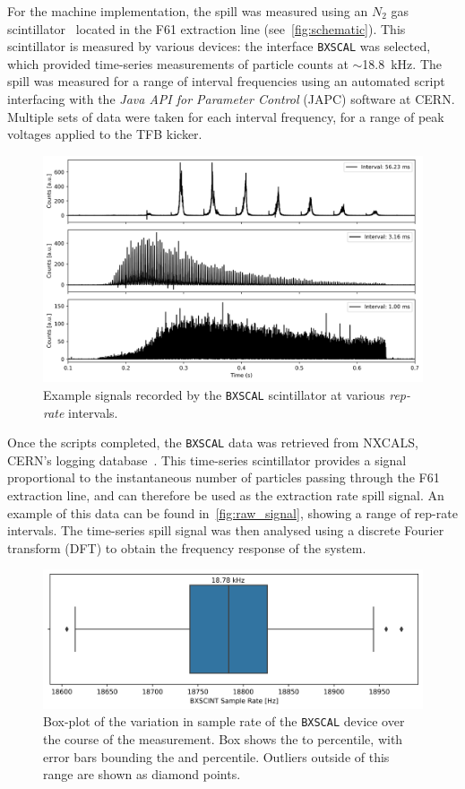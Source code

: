 \documentclass[11pt]{report}
\begin{document}
For the machine implementation, the spill was measured using an $N_2$ gas scintillator~\cite{Actis:bxscint} located in the F61 extraction line (see~\autoref{fig:schematic}). This scintillator is measured by various devices: the interface \verb|BXSCAL| was selected, which provided time-series measurements of particle counts at $\sim$\qty{18.8}{\kilo\hertz}. The spill was measured for a range of interval frequencies using an automated script interfacing with the \textit{Java API for Parameter Control} (JAPC) software at CERN. Multiple sets of data were taken for each interval frequency, for a range of peak voltages applied to the TFB kicker. 

\begin{figure}
  \centering
  \includegraphics*[width=0.7\linewidth]{raw_signal.png}
  \cprotect\caption{Example signals recorded by the \verb|BXSCAL| scintillator at various \textit{rep-rate} intervals.}\label{fig:raw_signal}
\end{figure}

Once the scripts completed, the \verb|BXSCAL| data was retrieved from NXCALS, CERN's logging database~\cite{nxcals}. This time-series scintillator provides a signal proportional to the instantaneous number of particles passing through the F61 extraction line, and can therefore be used as the extraction rate spill signal. An example of this data can be found in~\autoref{fig:raw_signal}, showing a range of rep-rate intervals. The time-series spill signal was then analysed using a discrete Fourier transform (DFT) to obtain the frequency response of the system. 


\begin{figure}
  \centering
  \includegraphics*[width=0.8\linewidth]{sample_rate_variation.png}
  \caption{Box-plot of the variation in sample rate of the \texttt{BXSCAL} device over the course of the measurement. Box shows the  to  percentile, with error bars bounding the  and  percentile. Outliers outside of this range are shown as diamond points.}\label{fig:sample_rate_variation}
\end{figure} %
\end{document}
